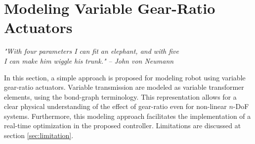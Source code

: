 

\newpage

\section{Modeling Variable Gear-Ratio Actuators}
\label{sec:model}

\begin{flushright}
{%
\textit{"With four parameters I can fit an elephant, and with five \\ I can make him wiggle his trunk."}
 }
 \emph{-- John von Neumann}
\end{flushright}
\vspace{+10pt}

In this section, a simple approach is proposed for modeling robot using variable gear-ratio actuators. Variable transmission are modeled as variable transformer elements, using the bond-graph terminology. This representation allows for a clear physical understanding of the effect of gear-ratio even for non-linear $n$-DoF systems. Furthermore, this modeling approach facilitates the implementation of a real-time optimization in the proposed controller. Limitations are discussed at section \ref{sec:limitation}.

